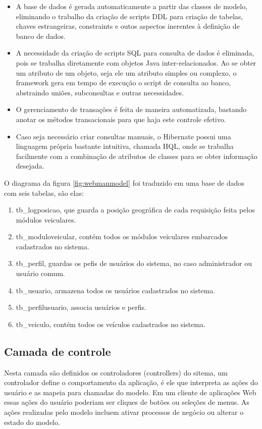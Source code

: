 \begin{itemize}
	\item A base de dados é gerada automaticamente a partir das classes de modelo, eliminando o trabalho da criação de scripts DDL para criação de tabelas, chaves estrangeiras, constraints e outos aspectos inerentes à definição de banco de dados.
	\item A necessidade da criação de scripts SQL para consulta de dados é eliminada, pois se trabalha diretamente com objetos Java inter-relacionados. Ao se obter um atributo de um objeto, seja ele um atributo simples ou complexo, o framework gera em tempo de execução o script de consulta ao banco, abstraindo uniões, subconsultas e outras necessidades.
	\item O gerenciamento de transações é feita de maneira automatizada, bastando anotar os métodos transacionais para que haja este controle efetivo.
	\item Caso seja necessário criar consultas manuais, o Hibernate possui uma linguagem própria bastante intuitiva, chamada HQL, onde se trabalha facilmente com a combinação de atributos de classes para se obter informação desejada. 
\end{itemize}

O diagrama da figura \ref{fig:webmanmodel} foi traduzido em uma base de dados com seis tabelas, são elas:

\begin{enumerate}
	\item tb\_logposicao, que guarda a posição geográfica de cada requisição feita pelos módulos veiculares.
	\item tb\_moduloveicular, contém todos os módulos veiculares embarcados cadastrados no sistema.
	\item tb\_perfil, guardas os pefis de usuários do sistema, no caso administrador ou usuário comum.
	\item tb\_usuario, armazena todos os usuários cadastrados no sistema.
	\item tb\_perfilusuario, associa usuários e perfis.
	\item tb\_veiculo, contém todos os veículos cadastrados no sistema.
\end{enumerate}

\subsection{Camada de controle}

Nesta camada são definidos os controladores (controllers) do sitema, um controlador define o comportamento da aplicação, é ele que interpreta as ações do usuário e as mapeia para chamadas do modelo. Em um cliente de aplicações Web essas ações do usuário poderiam ser cliques de botões ou seleções de menus. As ações realizadas pelo modelo incluem ativar processos de negócio ou alterar o estado do modelo.

